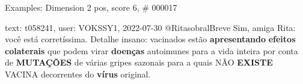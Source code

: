 \begin{frame}{Examples: Dimension 2 pos, score 6, \# 000017}
\footnotesize
\begin{exampleblock}{text: t058241, user: VOKSSY1, 2022-07-30}
@RitasobralBreve Sim, amiga Rita: você está corretíssima. Detalhe insano: 
vacinados estão \textbf{apresentando} \textbf{efeitos} \textbf{colaterais} que 
podem virar \textbf{doenças} autoimunes para a vida inteira por conta de 
\textbf{MUTAÇÕES} de várias gripes sazonais para a quais NÃO \textbf{EXISTE} 
VACINA decorrentes do \textbf{vírus} original.  
\end{exampleblock}
\end{frame}
